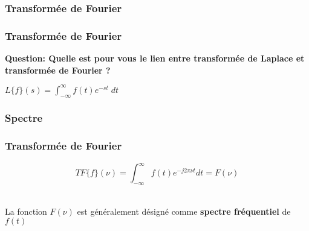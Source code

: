 \documentclass{beamer}
\begin{document}
\subsubsection{Transformée de Fourier}


\begin{frame}
\frametitle{Transformée de Fourier}
\textbf{Question: Quelle est pour vous le lien entre transformée de Laplace et transformée de Fourier ?}\\
\vspace{1 cm}
{
\begin{center}
	$L\{f\}(s) = \displaystyle \int^{\infty}_{-\infty} f(t) e^{-st} \; dt $ \only<3->{$ \rightarrow TF\{ f \}(\nu) = \displaystyle \int^{\infty}_{-\infty} f(t) e^{-j2\pi \nu t} dt $}
\end{center} 
}

\end{frame}

\subsubsection{Spectre}
\begin{frame}
\frametitle{Transformée de Fourier}
\[ TF\{ f \}(\nu) = \displaystyle \int^{\infty}_{-\infty} f(t) e^{-j2\pi \nu t} dt   = F(\nu) \]\\
\vspace{1cm}

La fonction $F(\nu)$ est généralement désigné comme \textbf{spectre fréquentiel} de $f(t)$ \\

\vspace{1cm}

\end{frame}
\end{document}
